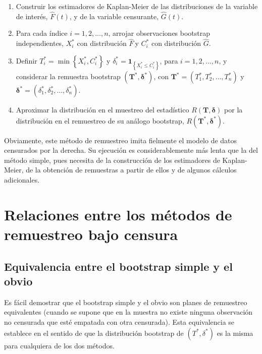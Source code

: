 \documentclass[]{book}
\theoremstyle{break}
\theoremstyle{definition}
\theoremstyle{definition}
\theoremstyle{definition}
\theoremstyle{remark}
\begin{document}
\begin{enumerate}
\def\labelenumi{\arabic{enumi}.}
\item
  Construir los estimadores de Kaplan-Meier de las distribuciones de la
  variable de interés, \(\hat{F}\left( t \right)\), y de la variable
  censurante, \(\hat{G}\left( t \right)\).
\item
  Para cada índice \(i=1,2,\ldots ,n\), arrojar observaciones bootstrap
  independientes, \(X_i^{\ast}\) con distribución \(\hat{F}\ \)y
  \(C_i^{\ast}\) con distribución \(\hat{G}\).
\item
  Definir \(T_i^{\ast}=\min \left\{ X_i^{\ast},C_i^{\ast}\right\}\) y
  \(\delta_i^{\ast}=\mathbf{1}_{\left\{ X_i^{\ast}\leq C_i^{\ast}\right\}}\),
  para \(i = 1, 2, \ldots, n\), y considerar la remuestra bootstrap
  \(\left( \mathbf{T}^{\ast},\boldsymbol{\delta}^{\ast}\right)\), con
  \(\mathbf{T}^{\ast}=\left( T_1^{\ast},T_2^{\ast}, \ldots, T_n^{\ast} \right)\)
  y
  \(\boldsymbol{\delta}^{\ast} = \left( \delta_1^{\ast}, \delta_2^{\ast},\ldots ,\delta_n^{\ast} \right)\).
\item
  Aproximar la distribución en el muestreo del estadístico
  \(R\left( \mathbf{T},\boldsymbol{\delta} \right)\) por la distribución
  en el remuestreo de su análogo bootstrap,
  \(R\left( \mathbf{T}^{\ast},\boldsymbol{\delta}^{\ast} \right)\).
\end{enumerate}

Obviamente, este método de remuestreo imita fielmente el modelo de datos
censurados por la derecha. Su ejecución es considerablemente más lenta
que la del método simple, pues necesita de la construcción de los
estimadores de Kaplan-Meier, de la obtención de remuestras a partir de
ellos y de algunos cálculos adicionales.

\section{Relaciones entre los métodos de remuestreo bajo
censura}\label{relaciones-entre-los-muxe9todos-de-remuestreo-bajo-censura}

\subsection{Equivalencia entre el bootstrap simple y el
obvio}\label{equivalencia-entre-el-bootstrap-simple-y-el-obvio}

Es fácil demostrar que el bootstrap simple y el obvio son planes de
remuestreo equivalentes (cuando se supone que en la muestra no existe
ninguna observación no censurada que esté empatada con otra censurada).
Esta equivalencia se establece en el sentido de que la distribución
bootstrap de \(\left( T^{\ast},\delta^{\ast} \right)\) es la misma para
cualquiera de los dos métodos.
\end{document}
